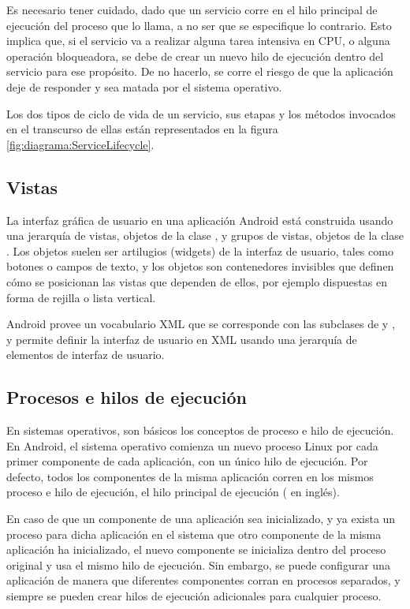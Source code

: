     Es necesario tener cuidado, dado que un servicio corre en el hilo principal de ejecución del proceso que lo llama, a no ser que se especifique lo contrario. Esto implica que, si el servicio va a realizar alguna tarea intensiva en CPU, o alguna operación bloqueadora, se debe de crear un nuevo hilo de ejecución dentro del servicio para ese propósito. De no hacerlo, se corre el riesgo de que la aplicación deje de responder y sea matada por el sistema operativo.

    Los dos tipos de ciclo de vida de un servicio, sus etapas y los métodos invocados en el transcurso de ellas están representados en la figura \ref{fig:diagrama:ServiceLifecycle}.

\FloatBarrier
\subsection{Vistas}
La interfaz gráfica de usuario en una aplicación Android está construida usando una jerarquía de vistas, objetos de la clase , y grupos de vistas, objetos de la clase . Los objetos  suelen ser artilugios (widgets) de la interfaz de usuario, tales como botones o campos de texto, y los objetos  son contenedores invisibles que definen cómo se posicionan las vistas que dependen de ellos, por ejemplo dispuestas en forma de rejilla o lista vertical.

Android provee un vocabulario XML que se corresponde con las subclases de  y , y permite definir la interfaz de usuario en XML usando una jerarquía de elementos de interfaz de usuario.

\subsection{Procesos e hilos de ejecución}
    En sistemas operativos, son básicos los conceptos de proceso e hilo de ejecución. En Android, el sistema operativo comienza un nuevo proceso Linux por cada primer componente de cada aplicación, con un único hilo de ejecución. Por defecto, todos los componentes de la misma aplicación corren en los mismos proceso e hilo de ejecución, el hilo principal de ejecución ( en inglés). 

    En caso de que un componente de una aplicación sea inicializado, y ya exista un proceso para dicha aplicación en el sistema que otro componente de la misma aplicación ha inicializado, el nuevo componente se inicializa dentro del proceso original y usa el mismo hilo de ejecución. Sin embargo, se puede configurar una aplicación de manera que diferentes componentes corran en procesos separados, y siempre se pueden crear hilos de ejecución adicionales para cualquier proceso.

